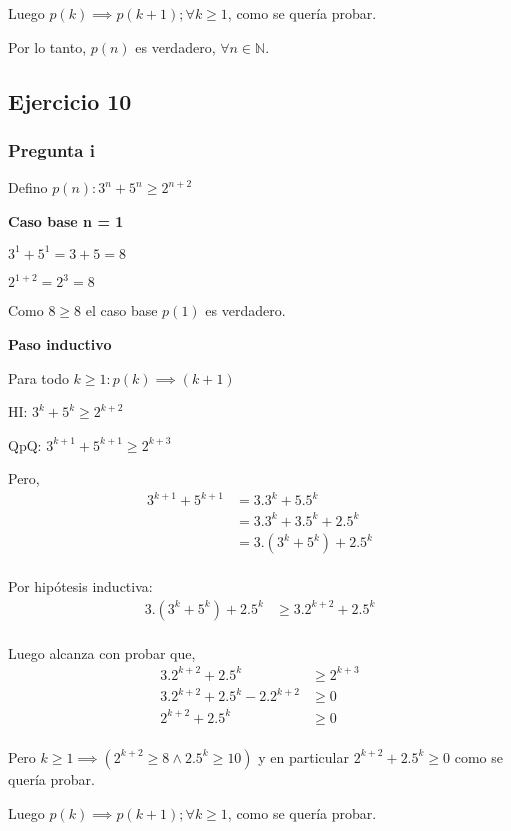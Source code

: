 Luego $p(k) \implies p(k+1); \forall k \geq 1$, como se quería probar.

Por lo tanto, $p(n)$ es verdadero, $\forall n \in \mathbb{N}$.

\subsection{Ejercicio 10}

\subsubsection{Pregunta i}

Defino $ p(n): 3^n + 5^n \geq 2^{n+2}$

\textbf{Caso base n = 1}

$3^1 + 5^1 = 3 + 5 = 8$

$2^{1+2} = 2^3 = 8$

Como $ 8 \geq 8 $ el caso base $p(1)$ es verdadero.

\textbf{Paso inductivo}

Para todo $k \geq 1: p(k) \implies (k+1)$

HI: $ 3^k + 5^k \geq 2^{k+2}$

QpQ: $ 3^{k+1} + 5^{k+1} \geq 2^{k+3}$

Pero,
\begin{align*}
    3^{k+1} + 5^{k+1} &= 3.3^k + 5.5^k \\ 
    &= 3.3^k + 3.5^k + 2.5^k \\
    &= 3.(3^k + 5^k) + 2.5^k \\
\end{align*}

Por hipótesis inductiva:
\begin{align*}
    3.(3^k + 5^k) + 2.5^k &\geq 3.2^{k+2} + 2.5^k \\
\end{align*}

Luego alcanza con probar que,
\begin{align*}
    3.2^{k+2} + 2.5^k &\geq 2^{k+3} \\
    3.2^{k+2} + 2.5^k - 2.2^{k+2} &\geq 0 \\
    2^{k+2} + 2.5^k &\geq 0 \\
\end{align*}

Pero $k \geq 1 \implies (2^{k+2} \geq 8 \wedge 2.5^k \geq 10)$ y en particular $2^{k+2} + 2.5^k \geq 0 $ como se quería probar.

Luego $p(k) \implies p(k+1); \forall k \geq 1$, como se quería probar.

